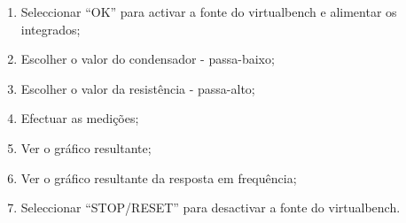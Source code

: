 \begin{enumerate}
	\item Seleccionar ``OK'' para activar a fonte do \acrshort{virtualbench} e alimentar os integrados;
	\item Escolher o valor do condensador - passa-baixo;
	\item Escolher o valor da resistência - passa-alto;
	\item Efectuar as medições;
	\item Ver o gráfico resultante;
	\item Ver o gráfico resultante da resposta em frequência;
	\item Seleccionar ``STOP/RESET'' para desactivar a fonte do \acrshort{virtualbench}.
\end{enumerate}